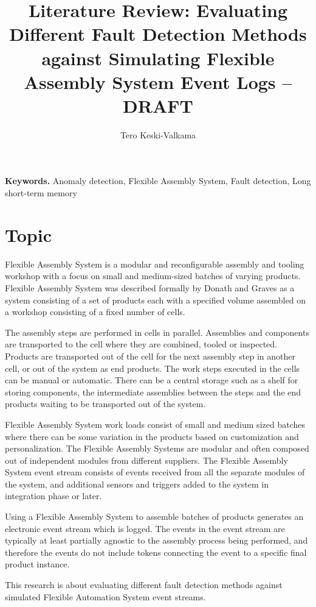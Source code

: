 \documentclass[a4paper,10pt]{article}
\title{Literature Review: Evaluating Different Fault Detection Methods against Simulating Flexible Assembly System Event Logs – DRAFT}
\author{Tero Keski-Valkama}
\begin{document}
\maketitle

\smallskip
\noindent \textbf{Keywords.} Anomaly detection, Flexible Assembly System, Fault detection, Long short-term memory

\tableofcontents

\section{Topic}
Flexible Assembly System is a modular and reconfigurable assembly and tooling workshop with a focus on small and medium-sized batches of varying products.
Flexible Assembly System was described formally by Donath and Graves \cite{donath1988flexible} as a system consisting of a set of products each with a specified volume
assembled on a workshop consisting of a fixed number of cells.

The assembly steps are performed in cells in parallel. Assemblies and components are transported to the cell where they are combined, tooled or inspected. Products
are transported out of the cell for the next assembly step in another cell, or out of the system as end products.
The work steps executed in the cells can be manual or automatic. There can be a central storage such as a shelf for storing components, the intermediate assemblies between the steps
and the end products waiting to be transported out of the system.

Flexible Assembly System work loads consist of small and medium sized batches where there can be some variation in the products based on customization and personalization.
The Flexible Assembly Systems are modular and often composed out of independent modules from different suppliers. The Flexible Assembly System event stream consists
of events received from all the separate modules of the system, and additional sensors and triggers added to the system in integration phase or later.

Using a Flexible Assembly System to assemble batches of products generates an electronic event stream which is logged. The events in the event stream are typically at least
partially agnostic to the assembly process being performed, and therefore the events do not include tokens connecting the event to a specific final product instance.

This research is about evaluating different fault detection methods against simulated Flexible Automation System event streams.
\end{document}
